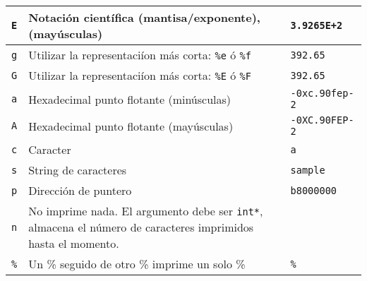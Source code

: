 \begin{center}
{\begin{xtabular}{|C{.15\columnwidth}|L{.65\columnwidth}|C{.20\columnwidth}|}
\texttt{E}      & Notaci\'on cient\'ifica (mantisa/exponente), (may\'usculas)                                                           & \texttt{3.9265E+2}    \\ \hline
\texttt{g}      & Utilizar la representaci\'ion m\'as corta: \texttt{\%e} \'o \texttt{\%f}                                              & \texttt{392.65}       \\ \hline
\texttt{G}      & Utilizar la representaci\'ion m\'as corta: \texttt{\%E} \'o \texttt{\%F}                                              & \texttt{392.65}       \\ \hline
\texttt{a}      & Hexadecimal punto flotante (min\'usculas)                                                                             & \texttt{-0xc.90fep-2} \\ \hline
\texttt{A}      & Hexadecimal punto flotante (may\'usculas)                                                                             & \texttt{-0XC.90FEP-2} \\ \hline
\texttt{c}      & Caracter                                                                                                              & \texttt{a}            \\ \hline
\texttt{s}      & String de caracteres                                                                                                  & \texttt{sample}       \\ \hline
\texttt{p}      & Direcci\'on de puntero                                                                                                & \texttt{b8000000}     \\ \hline
\texttt{n}      & No imprime nada. El argumento debe ser \texttt{int*}, almacena el n\'umero de caracteres imprimidos hasta el momento. &                       \\ \hline
\texttt{\%}     & Un \% seguido de otro \% imprime un solo \%                                                                           & \texttt{\%}           \\
\end{xtabular}
}

\vspace{0.2cm}


\end{center}
